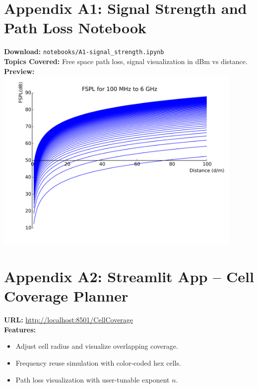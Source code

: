 \section{Appendix A1: Signal Strength and Path Loss Notebook}
\label{appendix:A1}
\textbf{Download:} \texttt{notebooks/A1-signal\_strength.ipynb} \\
\textbf{Topics Covered:} Free space path loss, signal visualization in dBm vs distance. \\
\textbf{Preview:}  
\includegraphics[width=0.9\textwidth]{./images/fspl_plot.png}

\section{Appendix A2: Streamlit App – Cell Coverage Planner}
\label{appendix:A2}
\textbf{URL:} \url{http://localhost:8501/CellCoverage} \\
\textbf{Features:} 
\begin{itemize}
    \item Adjust cell radius and visualize overlapping coverage.
    \item Frequency reuse simulation with color-coded hex cells.
    \item Path loss visualization with user-tunable exponent $n$.
\end{itemize}
